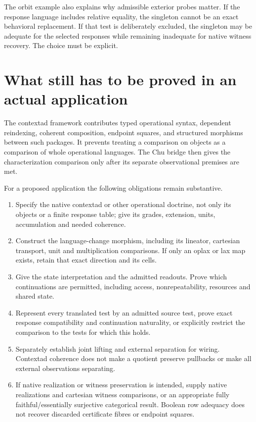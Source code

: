 \documentclass[11pt]{article}
\theoremstyle{definition}\newtheorem{definition}[theorem]{Definition}
\theoremstyle{remark}\newtheorem{remark}[theorem]{Remark}
\begin{document}
The orbit example also explains why admissible exterior probes matter. If
the response language includes relative equality, the singleton cannot be
an exact behavioral replacement. If that test is deliberately excluded,
the singleton may be adequate for the selected responses while remaining
inadequate for native witness recovery. The choice must be explicit.

\section{What still has to be proved in an actual application}
The contextad framework contributes typed operational syntax, dependent
reindexing, coherent composition, endpoint squares, and structured morphisms
between such packages. It prevents treating a comparison on objects as a
comparison of whole operational languages. The Chu bridge then gives the
characterization comparison only after its separate observational premises
are met.

For a proposed application the following obligations remain substantive.
\begin{enumerate}
\item Specify the native contextad or other operational doctrine, not only its
objects or a finite response table; give its grades, extension, units,
accumulation and needed coherence.
\item Construct the language-change morphism, including its lineator,
cartesian transport, unit and multiplication comparisons. If only an oplax
or lax map exists, retain that exact direction and its cells.
\item Give the state interpretation and the admitted readouts. Prove which
continuations are permitted, including access, nonrepeatability, resources
and shared state.
\item Represent every translated test by an admitted source test, prove exact
response compatibility and continuation naturality, or explicitly restrict
the comparison to the tests for which this holds.
\item Separately establish joint lifting and external separation for wiring.
Contextad coherence does not make a quotient preserve pullbacks or make all
external observations separating.
\item If native realization or witness preservation is intended, supply
native realizations and cartesian witness comparisons, or an appropriate
fully faithful/essentially surjective categorical result. Boolean row
adequacy does not recover discarded certificate fibres or endpoint squares.
\end{enumerate}
\end{document}
